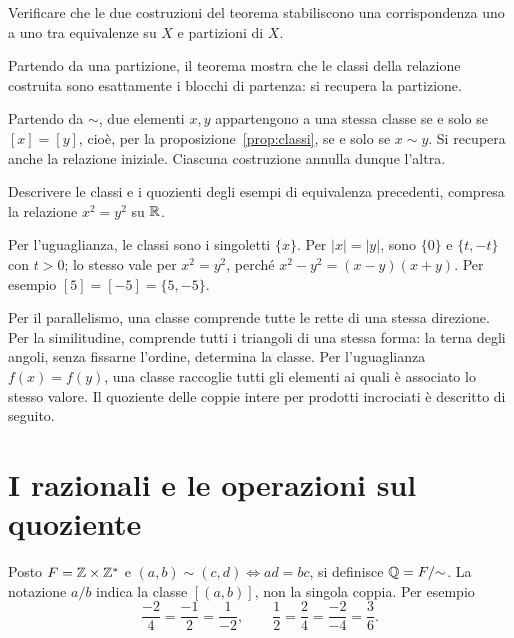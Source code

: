 \begin{schema}
\end{schema}

\begin{esercizio}
Verificare che le due costruzioni del teorema stabiliscono una corrispondenza uno a uno tra equivalenze su $X$ e partizioni di $X$.
\end{esercizio}
\begin{svolgimento}
Partendo da una partizione, il teorema mostra che le classi della relazione costruita sono esattamente i blocchi di partenza: si recupera la partizione.

Partendo da $\sim$, due elementi $x,y$ appartengono a una stessa classe se e solo se $[x]=[y]$, cioè, per la proposizione~\ref{prop:classi}, se e solo se $x\sim y$. Si recupera anche la relazione iniziale. Ciascuna costruzione annulla dunque l'altra.
\end{svolgimento}

\begin{esercizio}
Descrivere le classi e i quozienti degli esempi di equivalenza precedenti, compresa la relazione $x^2=y^2$ su $\mathbb{R}$.
\end{esercizio}
\begin{svolgimento}
Per l'uguaglianza, le classi sono i singoletti $\{x\}$. Per $|x|=|y|$, sono $\{0\}$ e $\{t,-t\}$ con $t>0$; lo stesso vale per $x^2=y^2$, perché $x^2-y^2=(x-y)(x+y)$. Per esempio $[5]=[-5]=\{5,-5\}$.

Per il parallelismo, una classe comprende tutte le rette di una stessa direzione. Per la similitudine, comprende tutti i triangoli di una stessa forma: la terna degli angoli, senza fissarne l'ordine, determina la classe. Per l'uguaglianza $f(x)=f(y)$, una classe raccoglie tutti gli elementi ai quali è associato lo stesso valore. Il quoziente delle coppie intere per prodotti incrociati è descritto di seguito.
\end{svolgimento}

\section{I razionali e le operazioni sul quoziente}
\begin{definizione}
Posto $F=\mathbb{Z}\times\mathbb{Z}^*$ e $(a,b)\sim(c,d)\iff ad=bc$, si definisce $\mathbb{Q}=F/{\sim}$. La notazione $a/b$ indica la classe $[(a,b)]$, non la singola coppia. Per esempio
\[
\frac{-2}{4}=\frac{-1}{2}=\frac{1}{-2},\qquad
\frac12=\frac24=\frac{-2}{-4}=\frac36.
\]
\end{definizione}

